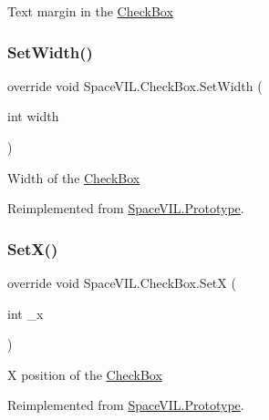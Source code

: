 Text margin in the \mbox{\hyperlink{class_space_v_i_l_1_1_check_box}{Check\+Box}} 

\mbox{\label{class_space_v_i_l_1_1_check_box_abcf26de1908f7d590b768d64851e8004}} 
\subsubsection{\texorpdfstring{Set\+Width()}{SetWidth()}}
{\footnotesize\ttfamily override void Space\+V\+I\+L.\+Check\+Box.\+Set\+Width (\begin{DoxyParamCaption}\item[{int}]{width }\end{DoxyParamCaption})\hspace{0.3cm}{\ttfamily [virtual]}}



Width of the \mbox{\hyperlink{class_space_v_i_l_1_1_check_box}{Check\+Box}} 



Reimplemented from \mbox{\hyperlink{class_space_v_i_l_1_1_prototype_a6a4f1b9581f4d18f1c3a3e287d4b2a2b}{Space\+V\+I\+L.\+Prototype}}.

\mbox{\label{class_space_v_i_l_1_1_check_box_a321e86a7868cb30b842988a4d607acc1}} 
\subsubsection{\texorpdfstring{Set\+X()}{SetX()}}
{\footnotesize\ttfamily override void Space\+V\+I\+L.\+Check\+Box.\+SetX (\begin{DoxyParamCaption}\item[{int}]{\+\_\+x }\end{DoxyParamCaption})\hspace{0.3cm}{\ttfamily [virtual]}}



X position of the \mbox{\hyperlink{class_space_v_i_l_1_1_check_box}{Check\+Box}} 



Reimplemented from \mbox{\hyperlink{class_space_v_i_l_1_1_prototype}{Space\+V\+I\+L.\+Prototype}}.

